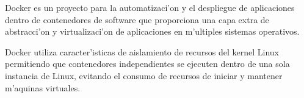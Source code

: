 Docker es un proyecto para la automatizaci'on y el despliegue de aplicaciones dentro de contenedores de software que proporciona una capa extra de abstracci'on y virtualizaci'on de aplicaciones en m'ultiples sistemas operativos.

Docker utiliza caracter'isticas de aislamiento de recursos del kernel Linux permitiendo que contenedores independientes se ejecuten dentro de una sola instancia de Linux, evitando el consumo de recursos de iniciar y mantener m'aquinas virtuales.

\clearpage